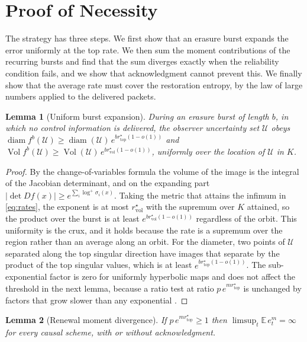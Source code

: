 \documentclass[journal]{IEEEtran}
\newtheorem{lemma}{Lemma}
\theoremstyle{definition}
\theoremstyle{remark}
\newcommand{\rvol}{r^\star_{\mathrm{vol}}}
\newcommand{\rtop}{r^\star_{\mathrm{top}}}
\newcommand{\E}{\mathbb{E}}
\DeclareMathOperator{\diam}{diam}
\DeclareMathOperator{\Vol}{Vol}
\begin{document}
\section{Proof of Necessity}\label{sec:nec}
The strategy has three steps. We first show that an erasure burst expands the error uniformly at the top rate. We
then sum the moment contributions of the recurring bursts and find that the sum diverges exactly when the
reliability condition fails, and we show that acknowledgment cannot prevent this. We finally show that the average
rate must cover the restoration entropy, by the law of large numbers applied to the delivered packets.

\begin{lemma}[Uniform burst expansion]\label{lem:burst}
During an erasure burst of length $b$, in which no control information is delivered, the observer uncertainty set
$\mathcal U$ obeys $\diam f^{b}(\mathcal U)\ge\diam(\mathcal U)\,e^{b\rtop(1-o(1))}$ and $\Vol f^{b}(\mathcal U)\ge
\Vol(\mathcal U)\,e^{b\rvol(1-o(1))}$, uniformly over the location of $\mathcal U$ in $K$.
\end{lemma}

\begin{proof}
By the change-of-variables formula the volume of the image is the integral of the Jacobian determinant, and on
the expanding part $|\det Df(x)|\ge e^{\sum_i\log^{+}\sigma_i(x)}$. Taking the metric that attains the infimum in
\eqref{eq:rates}, the exponent is at most $\rvol$ with the supremum over $K$ attained, so the product over the
burst is at least $e^{b\rvol(1-o(1))}$ regardless of the orbit. This uniformity is the crux, and it holds because
the rate is a supremum over the region rather than an average along an orbit. For the diameter, two points of
$\mathcal U$ separated along the top singular direction have images that separate by the product of the top
singular values, which is at least $e^{b\rtop(1-o(1))}$. The sub-exponential factor is zero for uniformly
hyperbolic maps and does not affect the threshold in the next lemma, because a ratio test at ratio
$p\,e^{m\rtop}$ is unchanged by factors that grow slower than any exponential \cite{katokhasselblatt1995}.
\end{proof}

\begin{lemma}[Renewal moment divergence]\label{lem:renewal}
If $p\,e^{m\rtop}\ge1$ then $\limsup_{t}\E\,e_t^{m}=\infty$ for every causal scheme, with or without
acknowledgment.
\end{lemma}
\end{document}
